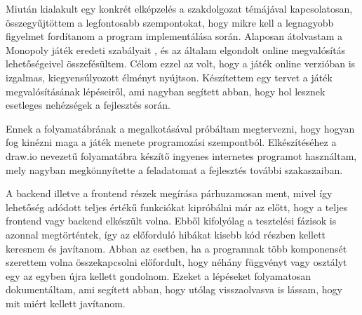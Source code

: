 

Miután kialakult egy konkrét elképzelés a szakdolgozat témájával kapcsolatosan, összegyűjtöttem a legfontosabb szempontokat, hogy mikre kell a legnagyobb figyelmet fordítanom a program implementálása során. Alaposan átolvastam a Monopoly játék eredeti szabályait \cite{coombs1987markup}, és az általam elgondolt online megvalósítás lehetőségeivel összefésültem. Célom ezzel az volt, hogy a játék online verzióban is izgalmas, kiegyensúlyozott élményt nyújtson. Készítettem egy tervet a játék megvalósításának lépéseiről, ami nagyban segített abban, hogy hol lesznek esetleges nehézségek a fejlesztés során.

Ennek a folyamatábrának a megalkotásával próbáltam megtervezni, hogy hogyan fog kinézni maga a játék menete programozási szempontból. Elkészítéséhez a draw.io nevezetű folyamatábra készítő ingyenes internetes programot használtam, mely nagyban megkönnyítette a feladatomat a fejlesztés további szakaszaiban.

A backend illetve a frontend részek megírása párhuzamosan ment, mivel így lehetőség adódott teljes értékű funkciókat kipróbálni már az előtt, hogy a teljes frontend vagy backend elkészült volna. Ebből kifolyólag a tesztelési fázisok is azonnal megtörténtek, így az előforduló hibákat kisebb kód részben kellett keresnem és javítanom. Abban az esetben, ha a programnak több komponensét szerettem volna összekapcsolni előfordult, hogy néhány függvényt vagy osztályt egy az egyben újra kellett gondolnom. Ezeket a lépéseket folyamatosan dokumentáltam, ami segített abban, hogy utólag visszaolvasva is lássam, hogy mit miért kellett javítanom.


